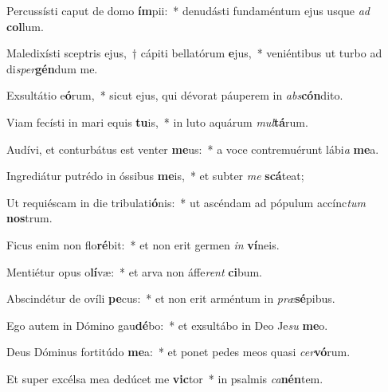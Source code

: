 \item Percussísti caput de domo \textbf{ím}pii:~* denudásti fundaméntum ejus usque \textit{ad} \textbf{col}lum.
\item Maledixísti sceptris ejus,~† cápiti bellatórum \textbf{e}jus,~* veniéntibus ut turbo ad di\textit{sper}\textbf{gén}dum me.
\item Exsultátio e\textbf{ó}rum,~* sicut ejus, qui dévorat páuperem in \textit{abs}\textbf{cón}dito.
\item Viam fecísti in mari equis \textbf{tu}is,~* in luto aquárum \textit{mul}\textbf{tá}rum.
\item Audívi, et conturbátus est venter \textbf{me}us:~* a voce contremuérunt lábi\textit{a} \textbf{me}a.
\item Ingrediátur putrédo in óssibus \textbf{me}is,~* et subter \textit{me} \textbf{scá}teat;
\item Ut requiéscam in die tribulati\textbf{ó}nis:~* ut ascéndam ad pópulum accínc\textit{tum} \textbf{nos}trum.
\item Ficus enim non flo\textbf{ré}bit:~* et non erit germen \textit{in} \textbf{ví}neis.
\item Mentiétur opus o\textbf{lí}væ:~* et arva non áffe\textit{rent} \textbf{ci}bum.
\item Abscindétur de ovíli \textbf{pe}cus:~* et non erit arméntum in \textit{præ}\textbf{sé}pibus.
\item Ego autem in Dómino gau\textbf{dé}bo:~* et exsultábo in Deo Je\textit{su} \textbf{me}o.
\item Deus Dóminus fortitúdo \textbf{me}a:~* et ponet pedes meos quasi \textit{cer}\textbf{vó}rum.
\item Et super excélsa mea dedúcet me \textbf{vic}tor~* in psalmis \textit{ca}\textbf{nén}tem.

